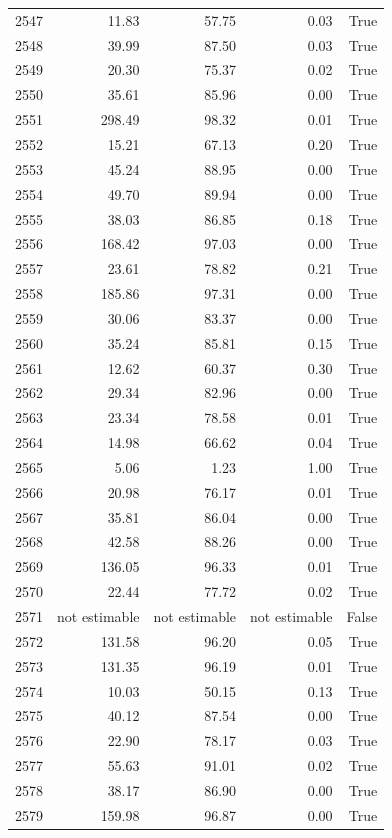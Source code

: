 \begin{longtable}{rrrrr}
2547 & 11.83 & 57.75 & 0.03 & True \\
2548 & 39.99 & 87.50 & 0.03 & True \\
2549 & 20.30 & 75.37 & 0.02 & True \\
2550 & 35.61 & 85.96 & 0.00 & True \\
2551 & 298.49 & 98.32 & 0.01 & True \\
2552 & 15.21 & 67.13 & 0.20 & True \\
2553 & 45.24 & 88.95 & 0.00 & True \\
2554 & 49.70 & 89.94 & 0.00 & True \\
2555 & 38.03 & 86.85 & 0.18 & True \\
2556 & 168.42 & 97.03 & 0.00 & True \\
2557 & 23.61 & 78.82 & 0.21 & True \\
2558 & 185.86 & 97.31 & 0.00 & True \\
2559 & 30.06 & 83.37 & 0.00 & True \\
2560 & 35.24 & 85.81 & 0.15 & True \\
2561 & 12.62 & 60.37 & 0.30 & True \\
2562 & 29.34 & 82.96 & 0.00 & True \\
2563 & 23.34 & 78.58 & 0.01 & True \\
2564 & 14.98 & 66.62 & 0.04 & True \\
2565 & 5.06 & 1.23 & 1.00 & True \\
2566 & 20.98 & 76.17 & 0.01 & True \\
2567 & 35.81 & 86.04 & 0.00 & True \\
2568 & 42.58 & 88.26 & 0.00 & True \\
2569 & 136.05 & 96.33 & 0.01 & True \\
2570 & 22.44 & 77.72 & 0.02 & True \\
2571 & not estimable & not estimable & not estimable & False \\
2572 & 131.58 & 96.20 & 0.05 & True \\
2573 & 131.35 & 96.19 & 0.01 & True \\
2574 & 10.03 & 50.15 & 0.13 & True \\
2575 & 40.12 & 87.54 & 0.00 & True \\
2576 & 22.90 & 78.17 & 0.03 & True \\
2577 & 55.63 & 91.01 & 0.02 & True \\
2578 & 38.17 & 86.90 & 0.00 & True \\
2579 & 159.98 & 96.87 & 0.00 & True \\

\end{longtable}

